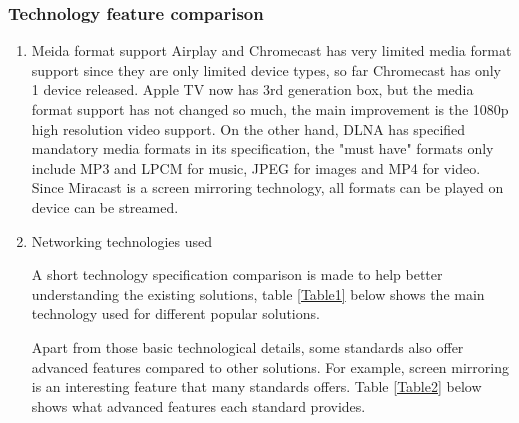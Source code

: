 \subsubsection*{Technology feature comparison}
 \begin{enumerate}
\item Meida format support 
Airplay and Chromecast has very limited media format support since they are only limited device 
types, so far Chromecast has only 1 device released. Apple TV now has 3rd generation box, but the 
media format support has not changed so much, the main improvement is the 1080p high resolution 
video support. On the other hand, DLNA has specified mandatory media formats in its specification, 
the "must have" formats only include MP3 and LPCM for music, JPEG for images and MP4 for video. 
Since Miracast is a screen mirroring technology, all formats can be played on device can be streamed.

\item Networking technologies used

A short technology specification comparison is made to help better understanding
the existing solutions, table \ref{Table1} below shows the main technology used
for different popular solutions.
\begin{table}[htb]
\caption{Technology used \label{Table1}}
\begin{center}
\end{center}
\end{table}

Apart from those basic technological details, some standards also offer advanced
features compared to other solutions. For example, screen mirroring is an
interesting feature that many standards offers. Table \ref{Table2} below shows
what advanced features each standard provides.
\begin{table}[htb]
\caption{Advanced feature comparison \label{Table2}}
\begin{center}
\end{center}
\end{table}


\end{enumerate} 
